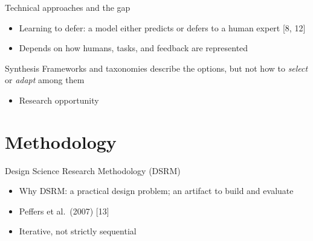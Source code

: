 \documentclass[aspectratio=169,11pt]{beamer}
\begin{document}
\begin{frame}{Technical approaches and the gap}
  \begin{itemize}
    \item Learning to defer: a model either predicts or defers to a human expert [8, 12]
    \item Depends on how humans, tasks, and feedback are represented
  \end{itemize}
  \vspace{0.8em}
  \begin{alertblock}{Synthesis}
    Frameworks and taxonomies describe the options, but not how to \emph{select}
    or \emph{adapt} among them
    \begin{itemize}
      \item[$\Rightarrow$] Research opportunity
    \end{itemize}
  \end{alertblock}
\end{frame}

\section{Methodology}

\begin{frame}{Design Science Research Methodology (DSRM)}
  \begin{itemize}
    \item Why DSRM: a practical design problem; an artifact to build and evaluate
    \item Peffers et al.\ (2007) [13]
    \item Iterative, not strictly sequential
  \end{itemize}
  \vspace{0.6em}
  \begin{center}
  \end{center}
\end{frame}
\end{document}
